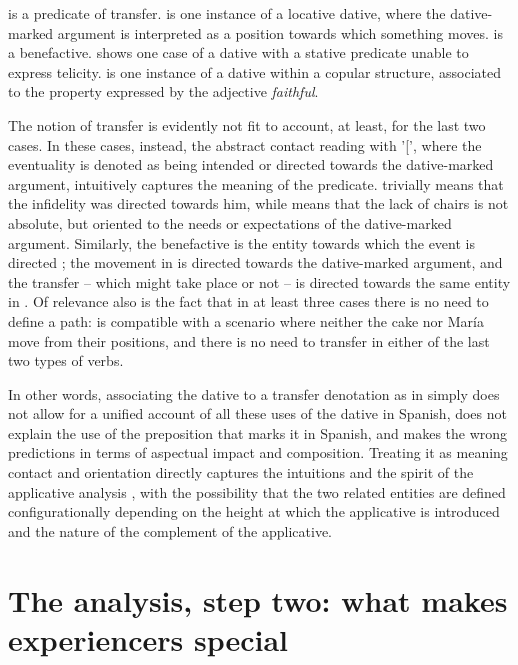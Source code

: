 \documentclass[output=paper,colorlinks,citecolor=brown,nonflat]{./langscibook}
\begin{document}
 is a predicate of transfer.  is one instance of a locative dative, where the dative-marked argument is interpreted as a position towards which something moves.  is a benefactive.  shows one case of a dative with a stative predicate unable to express telicity.  is one instance of a dative within a copular structure, associated to the property expressed by the adjective \textit{faithful}. 

The notion of transfer is evidently not fit to account, at least, for the last two cases. In these cases, instead, the abstract contact reading with '[', where the eventuality is denoted as being intended or directed towards the dative-marked argument, intuitively captures the meaning of the predicate.  trivially means that the infidelity was directed towards him, while  means that the lack of chairs is not absolute, but oriented to the needs or expectations of the dative-marked argument. Similarly, the benefactive is the entity towards which the event is directed ; the movement in  is directed towards the dative-marked argument, and the transfer – which might take place or not – is directed towards the same entity in . Of relevance also is the fact that in at least three cases there is no need to define a path:  is compatible with a scenario where neither the cake nor María move from their positions, and there is no need to transfer in either of the last two types of verbs.  

In other words, associating the dative to a transfer denotation as in  simply does not allow for a unified account of all these uses of the dative in Spanish, does not explain the use of the preposition that marks it in Spanish, and makes the wrong predictions in terms of aspectual impact and composition. Treating it as meaning contact and orientation directly captures the intuitions and the spirit of the applicative analysis \citep{Cuervo2003}, with the possibility that the two related entities are defined configurationally depending on the height at which the applicative is introduced and the nature of the complement of the applicative.

\section{The analysis, step two: what makes experiencers special}\label{sec:fabregas:3}
\end{document}
